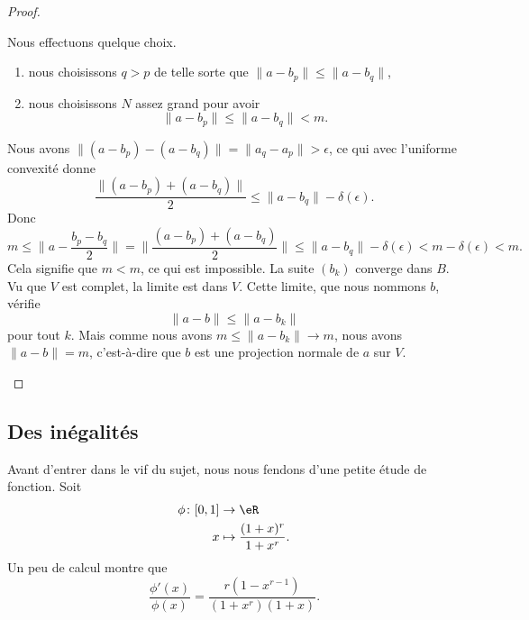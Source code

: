 \begin{proof}
\begin{subproof}
\begin{subproof}
				Nous effectuons quelque choix.
				\begin{enumerate}
					\item
					      nous choisissons \( q>p\) de telle sorte que \( \| a-b_p \|\leq\| a-b_q \|\),
					\item
					      nous choisissons \( N\) assez grand pour avoir
					      \begin{equation}
						      \| a-b_p \|\leq \| a-b_q \|<m.
					      \end{equation}
				\end{enumerate}


				Nous avons \( \| (a-b_p)-(a-b_q) \|=\| a_q-a_p \|>\epsilon\), ce qui avec l'uniforme convexité donne
				\begin{equation}
					\frac{ \| (a-b_p)+(a-b_q) \| }{2}\leq \| a-b_q \|-\delta(\epsilon).
				\end{equation}
				Donc
				\begin{equation}
					m\leq \| a-\frac{ b_p-b_q }{ 2 } \|=\| \frac{ (a-b_p)+(a-b_q) }{2} \|\leq \| a-b_q \|-\delta(\epsilon)<m-\delta(\epsilon)<m.
				\end{equation}
				Cela signifie que \( m<m\), ce qui est impossible.
				\spitem[Conclusion]
				La suite \( (b_k)\) converge dans \( B\). Vu que \( V\) est complet, la limite est dans \( V\). Cette limite, que nous nommons \( b\), vérifie
				\begin{equation}
					\| a-b \|\leq \| a-b_k \|
				\end{equation}
				pour tout \( k\). Mais comme nous avons \( m\leq \| a-b_k \|\to m\), nous avons \( \| a-b \|=m\), c'est-à-dire que \( b\) est une projection normale de \( a\) sur \( V\).
			\end{subproof}
		\end{subproof}
	\end{proof}

	\subsection{Des inégalités}

	Avant d'entrer dans le vif du sujet, nous nous fendons d'une petite étude de fonction. Soit
	\begin{equation}
		\begin{aligned}
			\phi\colon \mathopen[ 0 , 1 \mathclose] & \to \eR                            \\
			x                                       & \mapsto \frac{ (1+x)^r }{ 1+x^r }.
		\end{aligned}
	\end{equation}
	Un peu de calcul montre que
	\begin{equation}
		\frac{ \phi'(x) }{ \phi(x) }=\frac{ r(1-x^{r-1}) }{ (1+x^r)(1+x) }.
	\end{equation}

